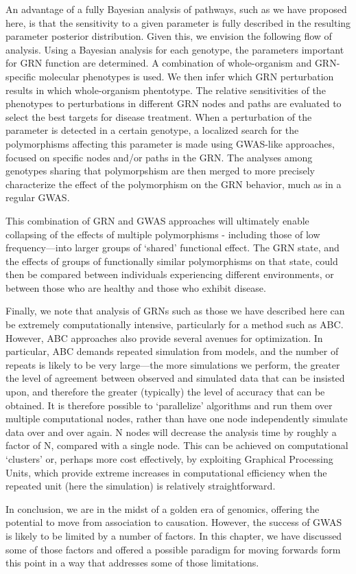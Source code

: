 An advantage of a fully Bayesian analysis of pathways, such as we have proposed here, is that the sensitivity to a given parameter is fully described in the resulting parameter posterior distribution. Given this, we envision the following flow of analysis. Using a Bayesian analysis for each genotype, the parameters important for GRN function are determined. A combination of whole-organism and GRN-specific molecular phenotypes is used. We then infer which GRN perturbation results in which whole-organism phentotype. The relative sensitivities of the phenotypes to perturbations in different GRN nodes and paths are evaluated to select the best targets for disease treatment. When a perturbation of the parameter is detected in a certain genotype, a localized search for the polymorphisms affecting this parameter is made using GWAS-like approaches, focused on specific nodes and/or paths in the GRN. The analyses among genotypes sharing that polymorpshism are then merged to more precisely characterize the effect of the polymorphism on the GRN behavior, much as in a regular GWAS.

This combination of GRN and GWAS approaches will ultimately enable collapsing of the effects of multiple polymorphisms - including those of low frequency—into larger groups of `shared' functional effect. The GRN state, and the effects of groups of functionally similar polymorphisms on that state, could then be compared between individuals experiencing different environments, or between those who are healthy and those who exhibit disease.

Finally, we note that analysis of GRNs such as those we have described here can be extremely computationally intensive, particularly for a method such as ABC. However, ABC approaches also provide several avenues for optimization. In particular, ABC demands repeated simulation from models, and the number of repeats is likely to be very large—the more simulations we perform, the greater the level of agreement between observed and simulated data that can be insisted upon, and therefore the greater (typically) the level of accuracy that can be obtained. It is therefore possible to `parallelize' algorithms and run them over multiple computational nodes, rather than have one node independently simulate data over and over again. N nodes will decrease the analysis time by roughly a factor of N, compared with a single node. This can be achieved on computational ‘clusters’ or, perhaps more cost effectively, by exploiting Graphical Processing Units, which provide extreme increases in computational efficiency when the repeated unit (here the simulation) is relatively straightforward.

In conclusion, we are in the midst of a golden era of genomics, offering the potential to move from association to causation. However, the success of GWAS is likely to be limited by a number of factors. In this chapter, we have discussed some of those factors and offered a possible paradigm for moving forwards form this point in a way that addresses some of those limitations.